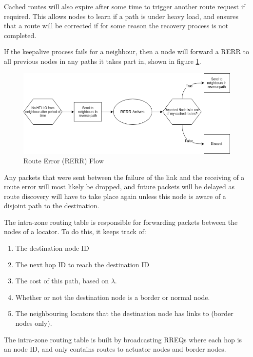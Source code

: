 \documentclass[12pt]{article}
\begin{document}
Cached routes will also expire after some time to trigger another route request if required. This allows nodes to learn if a path is under heavy load, and ensures that a route will be corrected if for some reason the recovery process is not completed. 

If the keepalive process fails for a neighbour, then a node will forward a RERR to all previous nodes in any paths it takes part in, shown in figure \ref{fig:rerrflow}.

\begin{figure}[h]
	\centering
	\includegraphics[width=\linewidth]{images/rerrflow}
	\caption{Route Error (RERR) Flow}
	\label{fig:rerrflow}
\end{figure}

Any packets that were sent between the failure of the link and the receiving of a route error will most likely be dropped, and future packets will be delayed as route discovery will have to take place again unless this node is aware of a disjoint path to the destination.


The intra-zone routing table is responsible for forwarding packets between the nodes of a locator. To do this, it keeps track of:

\begin{enumerate}
	\item The destination node ID
	\item The next hop ID to reach the destination ID
	\item The cost of this path, based on $\lambda$.
	\item Whether or not the destination node is a border or normal node.
	\item The neighbouring locators that the destination node has links to (border nodes only).
\end{enumerate}

The intra-zone routing table is built by broadcasting RREQs where each hop is an node ID, and only contains routes to actuator nodes and border nodes. 
\end{document}
